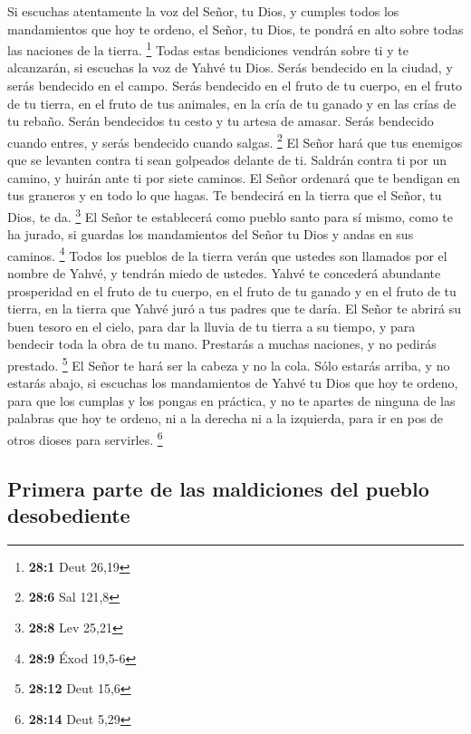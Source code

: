  Si escuchas atentamente la voz del Señor, tu Dios, y
cumples todos los mandamientos que hoy te ordeno, el Señor, tu Dios, te
pondrá en alto sobre todas las naciones de la tierra. \footnote{\textbf{28:1}
  Deut 26,19}  Todas estas bendiciones vendrán sobre ti y
te alcanzarán, si escuchas la voz de Yahvé tu Dios.  Serás
bendecido en la ciudad, y serás bendecido en el campo. 
Serás bendecido en el fruto de tu cuerpo, en el fruto de tu tierra, en
el fruto de tus animales, en la cría de tu ganado y en las crías de tu
rebaño.  Serán bendecidos tu cesto y tu artesa de amasar.
 Serás bendecido cuando entres, y serás bendecido cuando
salgas. \footnote{\textbf{28:6} Sal 121,8}  El Señor hará
que tus enemigos que se levanten contra ti sean golpeados delante de ti.
Saldrán contra ti por un camino, y huirán ante ti por siete caminos.
 El Señor ordenará que te bendigan en tus graneros y en
todo lo que hagas. Te bendecirá en la tierra que el Señor, tu Dios, te
da. \footnote{\textbf{28:8} Lev 25,21}  El Señor te
establecerá como pueblo santo para sí mismo, como te ha jurado, si
guardas los mandamientos del Señor tu Dios y andas en sus caminos.
\footnote{\textbf{28:9} Éxod 19,5-6}  Todos los pueblos
de la tierra verán que ustedes son llamados por el nombre de Yahvé, y
tendrán miedo de ustedes.  Yahvé te concederá abundante
prosperidad en el fruto de tu cuerpo, en el fruto de tu ganado y en el
fruto de tu tierra, en la tierra que Yahvé juró a tus padres que te
daría.  El Señor te abrirá su buen tesoro en el cielo,
para dar la lluvia de tu tierra a su tiempo, y para bendecir toda la
obra de tu mano. Prestarás a muchas naciones, y no pedirás prestado.
\footnote{\textbf{28:12} Deut 15,6}  El Señor te hará ser
la cabeza y no la cola. Sólo estarás arriba, y no estarás abajo, si
escuchas los mandamientos de Yahvé tu Dios que hoy te ordeno, para que
los cumplas y los pongas en práctica,  y no te apartes de
ninguna de las palabras que hoy te ordeno, ni a la derecha ni a la
izquierda, para ir en pos de otros dioses para servirles. \footnote{\textbf{28:14}
  Deut 5,29}

\hypertarget{primera-parte-de-las-maldiciones-del-pueblo-desobediente}{%
\subsection{Primera parte de las maldiciones del pueblo
desobediente}\label{primera-parte-de-las-maldiciones-del-pueblo-desobediente}}

